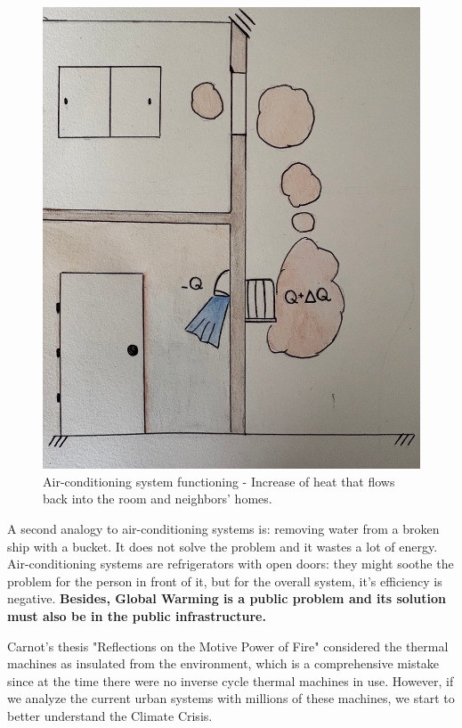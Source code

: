 \begin{figure}[ht]
    \centering
    \includegraphics[scale=0.35]{pictures/predio.png}
    \caption{Air-conditioning system functioning - Increase of heat that flows back into the room and neighbors' homes.}
    \label{predios}
\end{figure}

A second analogy to air-conditioning systems is: removing water from a broken ship with a bucket. It does not solve the problem and it wastes a lot of energy. Air-conditioning systems are refrigerators with open doors: they might soothe the problem for the person in front of it, but for the overall system, it's efficiency is negative. \textbf{Besides, Global Warming is a public problem and its solution must also be in the public infrastructure. }
                                                                           
Carnot's thesis "Reflections on the Motive Power of Fire" considered the thermal machines as insulated from the environment, which is a comprehensive mistake since at the time there were no inverse cycle thermal machines in use. However, if we analyze the current urban systems with millions of these machines, we start to better understand the Climate Crisis.

